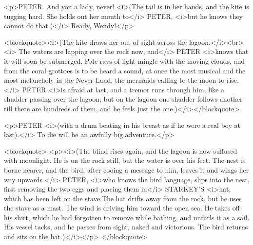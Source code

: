 <p>PETER. And you a lady, never! <i>(The tail is in her hands, and
the kite is tugging hard. She holds out her mouth to</i> PETER,
<i>but he knows they cannot do that.)</i> Ready, Wendy!</p>

<blockquote><i>(The kite draws her out of sight across the
lagoon.</i><br>
 <i>    The waters are lapping over the rock now, and</i> PETER
<i>knows that it will soon be submerged. Pale rays of light mingle
with the moving clouds, and from the coral grottoes is to be heard a
sound, at once the most musical and the most melancholy in the Never
Land, the mermaids calling to the moon to rise.</i> PETER <i>is
afraid at last, and a tremor runs through him, like a shudder passing
over the lagoon; but on the lagoon one shudder follows another till
there are hundreds of them, and he feels just the
one.)</i></blockquote>

<p>PETER <i>(with a drum beating in his breast as if he were a real
boy at last).</i> To die will be an awfully big adventure.</p>

<blockquote>
<p><i>(The blind rises again, and the lagoon is now suffused with
moonlight. He is on the rock still, but the water is over his feet.
The nest is borne nearer, and the bird, after cooing a message to
him, leaves it and wings her way upwards.</i> PETER, <i>who knows the
bird language, slips into the nest, first removing the two eggs and
placing them in</i> STARKEY'S <i>hat, which has been left on the
stave.The hat drifts away from the rock, but he uses the stave as a
mast. The wind is driving him toward the open sea. He takes off his
shirt, which he had forgotten to remove while bathing, and unfurls it
as a sail. His vessel tacks, and he passes from sight, naked and
victorious. The bird returns and sits on the hat.)</i></p>
</blockquote>
